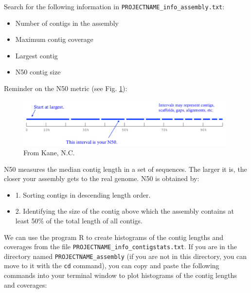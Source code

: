 \documentclass[11pt]{article}
\begin{document}
Search for the following information in \texttt{PROJECTNAME\_info\_assembly.txt}:
\begin{itemize}
\item Number of contigs in the assembly
\item Maximum contig coverage
\item Largest contig
\item N50 contig size
\end{itemize}

Reminder on the N50 metric (see Fig. \ref{fig:N50}):


\begin{figure}[htb]
\centering
\includegraphics[width=11cm]{N50.png}
\caption{\label{fig:N50}From Kane, N.C.}
\end{figure}


N50 measures the median contig length in a set of sequences. The
larger it is, the closer your assembly gets to the real genome. N50 is
obtained by:
\begin{itemize}
\item 1. Sorting contigs in descending length order.
\item 2. Identifying the size of the contig above which the assembly contains at least 50\% of the
total length of all contigs.
\end{itemize}


We can use the program R to create histograms of the contig lengths
and coverages from the file
\texttt{PROJECTNAME\_info\_contigstats.txt}. If you are in the
directory named \texttt{PROJECTNAME\_assembly} (if you are not in
this directory, you can move to it with the \texttt{cd} command), you can
copy and paste the following commands into your terminal window to
plot histograms of the contig lengths and coverages:
\end{document}
